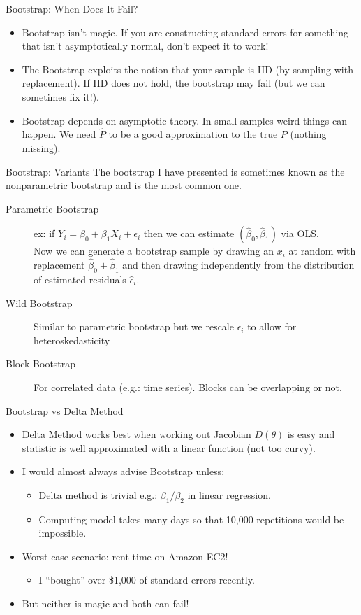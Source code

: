 \documentclass[11pt,handout,xcolor=pdftex,dvipsnames,table,mathserif,aspectratio=169]{beamer}
\begin{document}
\begin{frame}{Bootstrap: When Does It Fail?}
\begin{itemize}
\item Bootstrap isn't magic. If you are constructing standard errors for something that isn't asymptotically normal, don't expect it to work!
\item The Bootstrap exploits the notion that your sample is IID (by sampling with replacement). If IID does not hold, the bootstrap may fail (but we can sometimes fix it!).
\item Bootstrap depends on asymptotic theory. In small samples weird things can happen. We need $\hat{P}$ to be a good approximation to the true $P$ (nothing missing).
\end{itemize}
\end{frame}

\begin{frame}{Bootstrap: Variants}
The bootstrap I have presented is sometimes known as the \alert{nonparametric bootstrap} and is the most common one.
\begin{description}
\item[Parametric Bootstrap] ex: if $Y_i = \beta_0 + \beta_1 X_i + \epsilon_i$ then we can estimate $(\hat{\beta}_0,\hat{\beta}_1)$ via OLS.\\
 Now we can generate a bootstrap sample by drawing an $x_i$ at random with replacement $\hat{\beta}_0 + \hat{\beta}_1$ and then drawing \alert{independently} from the distribution of estimated residuals $\hat{\epsilon}_i$.
 \item[Wild Bootstrap] Similar to parametric bootstrap but we rescale $\epsilon_i$ to allow for \alert{heteroskedasticity}
\item[Block Bootstrap] For correlated data (e.g.: time series). Blocks can be overlapping or not.  
\end{description}
\end{frame}

\begin{frame}{Bootstrap vs Delta Method}
\begin{itemize}
\item Delta Method works best when working out Jacobian $D(\theta)$ is easy and statistic is well approximated with a linear function (not too curvy).
\item I would almost always advise Bootstrap unless:
\begin{itemize}
\item Delta method is trivial e.g.: $\beta_1 / \beta_2$ in linear regression.
\item Computing model takes many days so that 10,000 repetitions would be impossible.
\end{itemize}
\item Worst case scenario: rent time on Amazon EC2!
\begin{itemize}
\item I ``bought'' over \$1,000 of standard errors recently.
\end{itemize}
\item But neither is magic and both can fail!
\end{itemize}
\end{frame}
\end{document}
